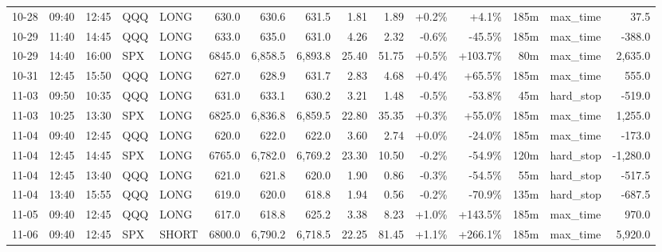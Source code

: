 \documentclass[11pt,a4paper,twoside]{article}
\begin{document}
\begin{landscape}
\begin{center}
\begin{longtable}{>{\color{txtmain}}l l l l l r r r r r r r r >{\color{txtmain}}l r}
10-28 & 09:40 & 12:45 & QQQ & LONG & 630.0 & 630.6 & 631.5 & 1.81 & 1.89 & \textcolor{wingreen}{+0.2\%} & \textcolor{wingreen}{+4.1\%} & 185m & max\_time & \textcolor{wingreen}{37.5} \\
10-29 & 11:40 & 14:45 & QQQ & LONG & 633.0 & 635.0 & 631.0 & 4.26 & 2.32 & \textcolor{lossred}{-0.6\%} & \textcolor{lossred}{-45.5\%} & 185m & max\_time & \textcolor{lossred}{-388.0} \\
10-29 & 14:40 & 16:00 & SPX & LONG & 6845.0 & 6,858.5 & 6,893.8 & 25.40 & 51.75 & \textcolor{wingreen}{+0.5\%} & \textcolor{wingreen}{+103.7\%} & 80m & max\_time & \textcolor{wingreen}{2,635.0} \\
10-31 & 12:45 & 15:50 & QQQ & LONG & 627.0 & 628.9 & 631.7 & 2.83 & 4.68 & \textcolor{wingreen}{+0.4\%} & \textcolor{wingreen}{+65.5\%} & 185m & max\_time & \textcolor{wingreen}{555.0} \\
11-03 & 09:50 & 10:35 & QQQ & LONG & 631.0 & 633.1 & 630.2 & 3.21 & 1.48 & \textcolor{lossred}{-0.5\%} & \textcolor{lossred}{-53.8\%} & 45m & hard\_stop & \textcolor{lossred}{-519.0} \\
11-03 & 10:25 & 13:30 & SPX & LONG & 6825.0 & 6,836.8 & 6,859.5 & 22.80 & 35.35 & \textcolor{wingreen}{+0.3\%} & \textcolor{wingreen}{+55.0\%} & 185m & max\_time & \textcolor{wingreen}{1,255.0} \\
11-04 & 09:40 & 12:45 & QQQ & LONG & 620.0 & 622.0 & 622.0 & 3.60 & 2.74 & \textcolor{wingreen}{+0.0\%} & \textcolor{lossred}{-24.0\%} & 185m & max\_time & \textcolor{lossred}{-173.0} \\
11-04 & 12:45 & 14:45 & SPX & LONG & 6765.0 & 6,782.0 & 6,769.2 & 23.30 & 10.50 & \textcolor{lossred}{-0.2\%} & \textcolor{lossred}{-54.9\%} & 120m & hard\_stop & \textcolor{lossred}{-1,280.0} \\
11-04 & 12:45 & 13:40 & QQQ & LONG & 621.0 & 621.8 & 620.0 & 1.90 & 0.86 & \textcolor{lossred}{-0.3\%} & \textcolor{lossred}{-54.5\%} & 55m & hard\_stop & \textcolor{lossred}{-517.5} \\
11-04 & 13:40 & 15:55 & QQQ & LONG & 619.0 & 620.0 & 618.8 & 1.94 & 0.56 & \textcolor{lossred}{-0.2\%} & \textcolor{lossred}{-70.9\%} & 135m & hard\_stop & \textcolor{lossred}{-687.5} \\
11-05 & 09:40 & 12:45 & QQQ & LONG & 617.0 & 618.8 & 625.2 & 3.38 & 8.23 & \textcolor{wingreen}{+1.0\%} & \textcolor{wingreen}{+143.5\%} & 185m & max\_time & \textcolor{wingreen}{970.0} \\
11-06 & 09:40 & 12:45 & SPX & SHORT & 6800.0 & 6,790.2 & 6,718.5 & 22.25 & 81.45 & \textcolor{wingreen}{+1.1\%} & \textcolor{wingreen}{+266.1\%} & 185m & max\_time & \textcolor{wingreen}{5,920.0} \\

\end{longtable}
\end{center}
\end{landscape}
\end{document}

